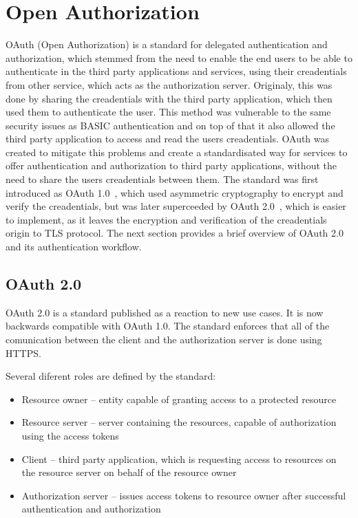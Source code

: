 \section{Open Authorization}
OAuth (Open Authorization) is a standard for delegated authentication and authorization, which stemmed from the need to enable the end users to be able to authenticate in the third party applications and services, using their creadentials from other service, which acts as the authorization server. Originaly, this was done by sharing the creadentials with the third party application, which then used them to authenticate the user. This method was vulnerable to the same security issues as BASIC authentication and on top of that it also allowed the third party application to access and read the users creadentials. OAuth was created to mitigate this problems and create a standardisated way for services to offer authentication and authorization to third party applications, without the need to share the users creadentials between them. The standard was first introduced as OAuth 1.0 \cite{oauth1_rfc}, which used asymmetric cryptography to encrypt and verify the creadentials, but was later superceeded by OAuth 2.0 \cite{oauth2_rfc}, which is easier to implement, as it leaves the encryption and verification of the creadentials origin to TLS protocol. The next section provides a brief overview of OAuth 2.0 and its authentication workflow.

\subsection{OAuth 2.0}
OAuth 2.0 is a standard published as a reaction to new use cases. It is now backwards compatible with OAuth 1.0. The standard enforces that all of the comunication between the client and the authorization server is done using HTTPS. 

Several diferent roles are defined by the standard:
\begin{itemize}
  \item Resource owner -- entity capable of granting access to a protected resource
  \item Resource server -- server containing the resources, capable of authorization using the access tokens
  \item Client -- third party application, which is requesting access to resources on the resource server on behalf of the resource owner
  \item Authorization server -- issues access tokens to resource owner after successful authentication and authorization
\end{itemize}

